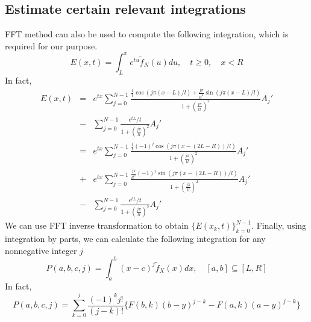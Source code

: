\documentclass[numreferences]{kluwer}    %
\begin{document}
\begin{article}
\section{Estimate certain relevant integrations}
FFT method can also be used to compute the following integration,
which is required for our purpose.
\begin{equation}
E(x,t)=\int^x_L e^{tu}\tilde{f}_N(u)du,\quad t\ge 0,\quad x<R
\end{equation}
In fact,
\begin{eqnarray}
E(x,t)&=&e^{tx}\sum_{j=0}^{N-1}\frac{\frac{1}{t}\cos(j\pi(x-L)/l) +
\frac{j\pi}{lt^2}\sin(j\pi(x-L)/l)
}{1+(\frac{j\pi}{tl})^2}A_j'\nonumber\\
&-&\sum_{j=0}^{N-1}\frac{e^{tL}/t}{1+(\frac{j\pi}{tl})^2}A_j'\nonumber\\
&=&e^{tx}\sum_{j=0}^{N-1}\frac{\frac{1}{t}(-1)^j\cos(j\pi(x-(2L-R))/l)}{1+(\frac{j\pi}{tl})^2}A_j'\nonumber\\
& +&e^{tx}\sum_{j=0}^{N-1}
\frac{\frac{j\pi}{lt^2}(-1)^j\sin(j\pi(x-(2L-R))/l)
}{1+(\frac{j\pi}{tl})^2}A_j'\\
&-&\sum_{j=0}^{N-1}\frac{e^{tL}/t}{1+(\frac{j\pi}{tl})^2}A_j' \label{Ext}
\end{eqnarray}
We can use FFT inverse transformation to obtain
$\{E(x_k,t)\}_{k=0}^{N-1}$.
Finally, using integration by parts, we can calculate the following integration for any nonnegative integer $j$
\[
P(a,b,c,j)=\int^{b}_a(x-c)^j \tilde{f}_X(x)dx, \quad
[a,b]\subseteq [L,R]
\]
In fact,
\begin{equation}\label{pyd}
P(a,b,c,j)=\sum_{k=0}^{j}\frac{(-1)^{k} j! }{(j-k)!}
\{F(b,k)(b-y)^{j-k}-F(a,k)(a-y)^{j-k}\}
\end{equation}



%





\end{article}
\end{document}
